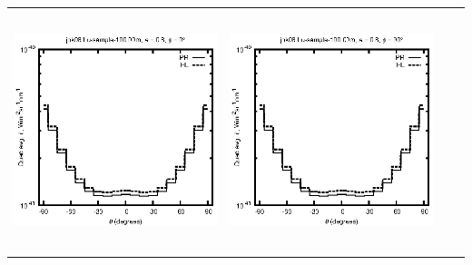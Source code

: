 \documentclass[10pt,a4paper]{article}
\begin{document}
\begin{adjustwidth}{-1.2in}{-1.2in}
\begin{tabular}{c c c c}
\includegraphics[height=7cm]{../eps/jok08_Lu_sample_100.00m_fwd.eps} &
\includegraphics[height=7cm]{../eps/jok08_Lu_sample_100.00m_cross.eps} \\
\end{tabular}

\pagebreak


\end{adjustwidth}
\end{document}
